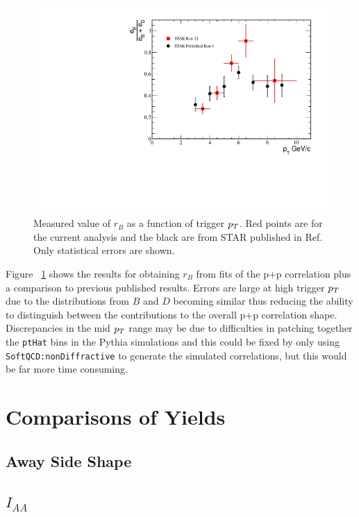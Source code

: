 \begin{figure}[htbp]
\begin{center}
\includegraphics[scale=.8]{Plots/Correlations/BD_ratio.pdf}
\end{center}
\caption[B/D Ratio]{Measured value of $r_B$ as a function of trigger $p_{T}$. Red points are for the current analysis and the black are from STAR published in Ref. Only statistical errors are shown.}
\label{fig:BDRatio}
\end{figure}

Figure ~\ref{fig:BDRatio} shows the results for obtaining $r_B$ from fits of the p+p correlation plus a comparison to previous published results. Errors are large at high trigger $p_{T}$ due to the distributions from $B$ and $D$ becoming similar thus reducing the ability to distinguish between the contributions to the overall p+p correlation shape. Discrepancies in the mid $p_{T}$ range may be due to difficulties in patching together the \texttt{ptHat} bins in the Pythia simulations and this could be fixed by only using \texttt{SoftQCD:nonDiffractive} to generate the simulated correlations, but this would be far more time consuming. 

\section{Comparisons of Yields}

\subsection{Away Side Shape}

\subsection{$I_{AA}$}

